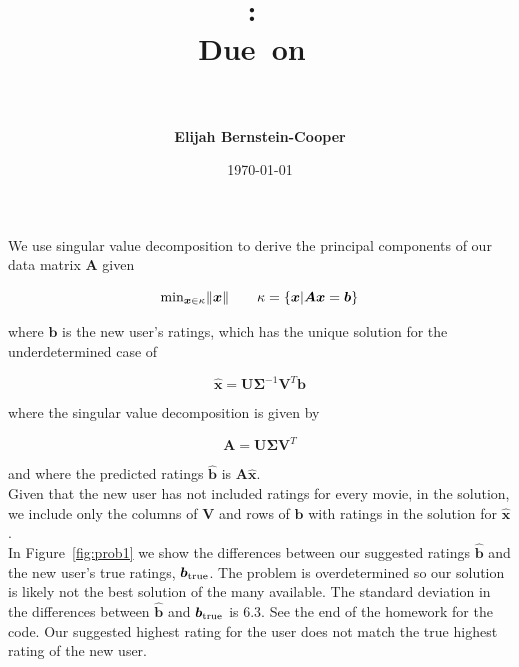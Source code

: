 \documentclass{article}
\title{\vspace{0in}
    \textmd{\textbf{\hmwkClass:\ \hmwkTitle}}\\
    \normalsize\vspace{0.1in}\small{Due\ on\ \hmwkDueDate}\\
    \vspace{0.1in}\large{\textit{\hmwkClassInstructor\ \hmwkClassTime}}
    \vspace{0.5in}}
\author{\textbf{Elijah Bernstein-Cooper}}
\date{\today} %
\begin{document}
\maketitle

\begin{homeworkProblem}

    We use singular value decomposition to derive the principal components of
    our data matrix $\bm{A}$ given
    
    \begin{equation}
        {\rm min}_{\bm{x} \in \kappa} \|\bm{x}\| \qquad \kappa = \{\bm{x} | \bm{A x} =
        \bm{b}\}
    \end{equation}

    \noindent where $\bm{b}$ is the new user's ratings, which has the unique
    solution for the underdetermined case of

    \begin{equation}
        \bm{\hat{x}} = \bm{U}\bm{\Sigma}^{-1}\bm{V}^T\bm{b}
    \end{equation}

    \noindent where the singular value decomposition is given by

    \begin{equation}
        \bm{A} = \bm{U}\bm{\Sigma}\bm{V}^T
    \end{equation}

    \noindent and where the predicted ratings $\bm{\hat{b}}$ is
    $\bm{A}\bm{\hat{x}}$. \\

    Given that the new user has not included ratings for every movie, in the
    solution, we include only the columns of $\bm{V}$ and rows of $\bm{b}$ with
    ratings in the solution for $\bm{\hat{x}}$. \\

    In Figure~\ref{fig:prob1} we show the differences between our suggested
    ratings $\bm{\hat{b}}$ and the new user's true ratings, $\bm{b}_{\rm
    true}$. The problem is overdetermined so our solution is likely not the
    best solution of the many available. The standard deviation in the
    differences between $\bm{\hat{b}}$ and $\bm{b}_{\rm true}$ is 6.3. See the
    end of the homework for the code. Our suggested highest rating for the user
    does not match the true highest rating of the new user.


\end{homeworkProblem}
\end{document}
